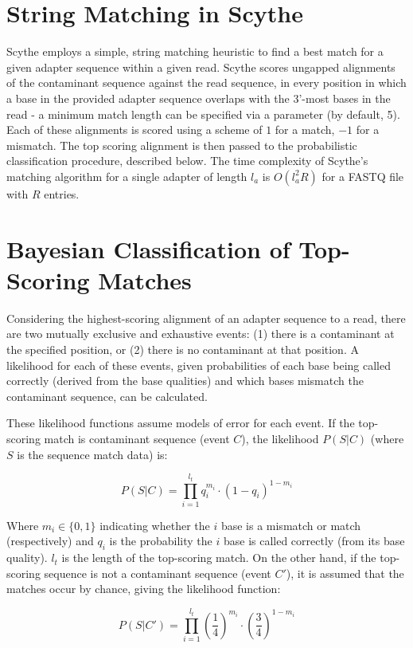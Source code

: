 \documentclass{bioinfo}
\begin{document}
\begin{methods}
\section{String Matching in Scythe}

Scythe employs a simple, string matching heuristic to find a best
match for a given adapter sequence within a given read. Scythe scores
ungapped alignments of the contaminant sequence against the read
sequence, in every position in which a base in the provided adapter
sequence overlaps with the 3'-most bases in the read - a minimum match
length can be specified via a parameter (by default, 5). Each of these
alignments is scored using a scheme of $1$ for a match, $-1$ for a
mismatch. The top scoring alignment is then passed to the
probabilistic classification procedure, described below. The time
complexity of Scythe's matching algorithm for a single adapter of
length $l_a$ is $O(l_a^2 R)$ for a FASTQ file with $R$ entries.


\section{Bayesian Classification of Top-Scoring Matches}

Considering the highest-scoring alignment of an adapter sequence to a
read, there are two mutually exclusive and exhaustive events: (1)
there is a contaminant at the specified position, or (2) there is no
contaminant at that position. A likelihood for each of these events,
given probabilities of each base being called correctly (derived from
the base qualities) and which bases mismatch the contaminant sequence,
can be calculated.

These likelihood functions assume models of error for each event. If
the top-scoring match is contaminant sequence (event $C$), the
likelihood $P(S | C)$ (where $S$ is the sequence match data) is:

$$ P(S | C) = \prod_{i=1}^{l_t} q_i^{m_i} \cdot (1-q_i)^{1 - m_i} $$

Where $m_i \in \{0, 1\}$ indicating whether the $i$ base is a mismatch
or match (respectively) and $q_i$ is the probability the $i$ base is
called correctly (from its base quality). $l_t$ is the length of the
top-scoring match. On the other hand, if the top-scoring sequence is
not a contaminant sequence (event $C'$), it is assumed that the
matches occur by chance, giving the likelihood function:

$$ P(S | C') = \prod_{i=1}^{l_t} \left(\frac{1}{4}\right)^{m_i} \cdot \left(\frac{3}{4}\right)^{1 - m_i} $$


\end{methods}
\end{document}
